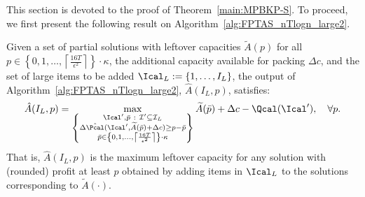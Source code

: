 This section is devoted to the proof of Theorem~\ref{main:MPBKP-S}. 
To proceed, we first present the following result on Algorithm~\ref{alg:FPTAS_nTlogn_large2}.
\begin{lemma}\label{hat2}
Given a set of partial solutions with leftover capacities $\widetilde{A}({p})$ for all ${p}\in\left\{ 0, 1, \ldots,\left\lceil\frac{16T}{\epsilon^2}\right\rceil \right\} \cdot \kappa$, the additional capacity available for packing $\Delta c$, and the set of large items to be added $\Ical_L:=\{1,\ldots, I_L\}$, the output of Algorithm~\ref{alg:FPTAS_nTlogn_large2}, $\hat{A}(I_L,p)$, satisfies: 
\begin{align}\label{largeDP2}
\hat{A}(I_L,p) = \max_{\left\{\substack{ \Ical',\bar{p}\  : \ 
		\mathcal{I}'\subseteq \mathcal{I}_L\\
		\Delta \hat{\Pcal}(\Ical', \widetilde{A}(\bar{p})+\Delta c) \ge p-\bar{p}\\
		\bar{p}\in\left\{ 0, 1, \ldots,\left\lceil\frac{16T}{\epsilon^2}\right\rceil \right\} \cdot \kappa}\right\}} \widetilde{A}(\bar{p})+ \Delta c-\Qcal(\Ical'),\quad \forall p.
\end{align}
That is, $\hat{A}(I_L,p)$ is the maximum leftover capacity for any solution with (rounded) profit at least $p$ obtained by adding items in $\Ical_L$ to the solutions corresponding to $\widetilde{A}(\cdot)$.
\end{lemma}

